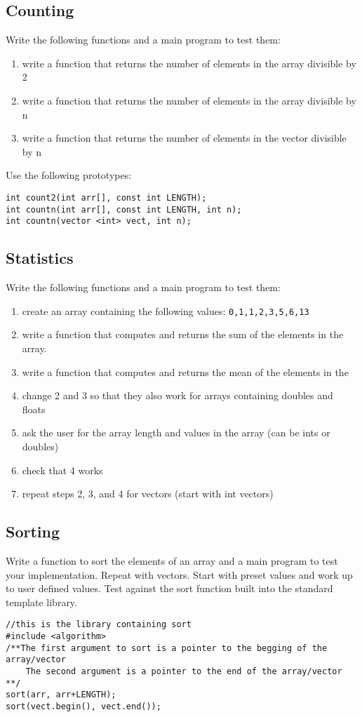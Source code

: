 \documentclass{article}
\begin{document}
\subsection{Counting}
Write the following functions and a main program to test them:
\begin{enumerate}
	\item write a function that returns the number of elements in the array divisible by 2
	\item write a function that returns the number of elements in the array divisible by n
	\item write a function that returns the number of elements in the vector divisible by n
\end{enumerate}
Use the following prototypes:
\begin{verbatim}
int count2(int arr[], const int LENGTH);
int countn(int arr[], const int LENGTH, int n);
int countn(vector <int> vect, int n);
\end{verbatim}

\subsection{Statistics}
Write the following functions and a main program to test them:
\begin{enumerate}
	\item create an array containing the following values: \texttt{{0,1,1,2,3,5,6,13}}
	\item write a function that computes and returns the sum of the elements in the array. 
	\item write a function that computes and returns the mean of the elements in the
	\item change 2 and 3 so that they also work for arrays containing doubles and floats
	\item ask the user for the array length and values in the array (can be ints or doubles)
	\item check that 4 works
	\item repeat steps 2, 3, and 4 for vectors (start with int vectors)
\end{enumerate}

\subsection{Sorting}
Write a function to sort the elements of an array and a main program to test your implementation. Repeat with vectors. Start with preset values and work up to user defined values. Test against the sort function built into the standard template library.

\begin{verbatim}
//this is the library containing sort
#include <algorithm>
/**The first argument to sort is a pointer to the begging of the array/vector
    The second argument is a pointer to the end of the array/vector
**/ 
sort(arr, arr+LENGTH);
sort(vect.begin(), vect.end());
\end{verbatim}
\end{document}
